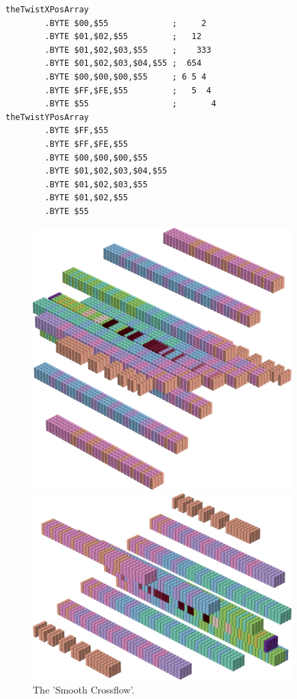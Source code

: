 \begin{lstlisting}[caption=Source code for the Twist]
theTwistXPosArray                        
        .BYTE $00,$55             ;     2  
        .BYTE $01,$02,$55         ;   12   
        .BYTE $01,$02,$03,$55     ;    333 
        .BYTE $01,$02,$03,$04,$55 ;  654   
        .BYTE $00,$00,$00,$55     ; 6 5 4  
        .BYTE $FF,$FE,$55         ;   5  4 
        .BYTE $55                 ;       4
theTwistYPosArray
        .BYTE $FF,$55
        .BYTE $FF,$FE,$55
        .BYTE $00,$00,$00,$55
        .BYTE $01,$02,$03,$04,$55
        .BYTE $01,$02,$03,$55
        .BYTE $01,$02,$55
        .BYTE $55
\end{lstlisting}




\clearpage
%
\begin{minipage}[b]{0.48\linewidth}
\begin{figure}[H]
    \centering
    \begin{adjustbox}{width=5cm,margin=0cm 0cm}
      \includegraphics[width=10cm]{src/colorspace_patterns/pattern1-45.png}%
    \end{adjustbox}
    \begin{adjustbox}{width=5cm,margin=0cm 0cm}
      \includegraphics[width=10cm]{src/colorspace_patterns/pattern1-225.png}%
    \end{adjustbox}
\caption{The 'Smooth Crossflow'.}
\end{figure}
\end{minipage}
